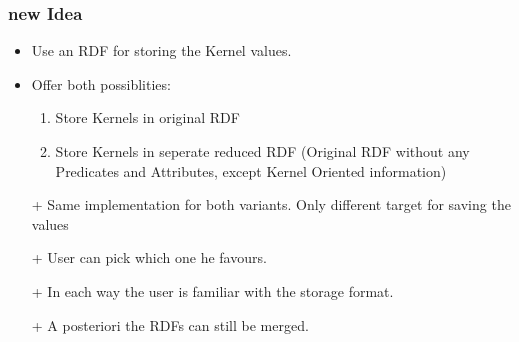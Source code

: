 \begin{frame}[fragile,t]
\frametitle{new Idea}
\begin{itemize}
\item Use an RDF for storing the Kernel values. \pause
\item Offer both possiblities:
\begin{enumerate}
\item Store Kernels in original RDF
\item Store Kernels in seperate reduced RDF (Original RDF without any Predicates and Attributes, except Kernel Oriented information)
\end{enumerate}
\pause
\item[+] Same implementation for both variants. Only different target for saving the values
\item[+] User can pick which one he favours.
\item[+] In each way the user is familiar with the storage format.
\item[+] A posteriori the RDFs can still be merged.
\end{itemize}
\end{frame}










